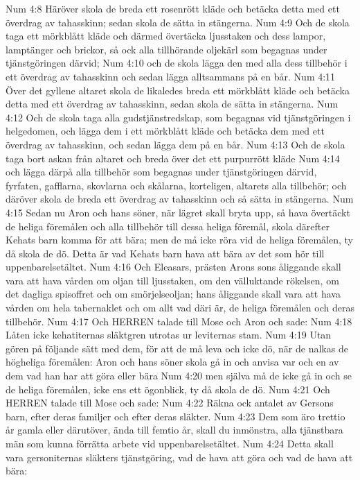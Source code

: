 Num 4:8  Häröver skola de breda ett rosenrött kläde och betäcka detta med ett överdrag av tahasskinn; sedan skola de sätta in stängerna.
Num 4:9  Och de skola taga ett mörkblått kläde och därmed övertäcka ljusstaken och dess lampor, lamptänger och brickor, så ock alla tillhörande oljekärl som begagnas under tjänstgöringen därvid;
Num 4:10  och de skola lägga den med alla dess tillbehör i ett överdrag av tahasskinn och sedan lägga alltsammans på en bår.
Num 4:11  Över det gyllene altaret skola de likaledes breda ett mörkblått kläde och betäcka detta med ett överdrag av tahasskinn, sedan skola de sätta in stängerna.
Num 4:12  Och de skola taga alla gudstjänstredskap, som begagnas vid tjänstgöringen i helgedomen, och lägga dem i ett mörkblått kläde och betäcka dem med ett överdrag av tahasskinn, och sedan lägga dem på en bår.
Num 4:13  Och de skola taga bort askan från altaret och breda över det ett purpurrött kläde
Num 4:14  och lägga därpå alla tillbehör som begagnas under tjänstgöringen därvid, fyrfaten, gafflarna, skovlarna och skålarna, korteligen, altarets alla tillbehör; och däröver skola de breda ett överdrag av tahasskinn och så sätta in stängerna.
Num 4:15  Sedan nu Aron och hans söner, när lägret skall bryta upp, så hava övertäckt de heliga föremålen och alla tillbehör till dessa heliga föremål, skola därefter Kehats barn komma för att bära; men de må icke röra vid de heliga föremålen, ty då skola de dö. Detta är vad Kehats barn hava att bära av det som hör till uppenbarelsetältet.
Num 4:16  Och Eleasars, prästen Arons sons åliggande skall vara att hava vården om oljan till ljusstaken, om den välluktande rökelsen, om det dagliga spisoffret och om smörjelseoljan; hans åliggande skall vara att hava vården om hela tabernaklet och om allt vad däri är, de heliga föremålen och deras tillbehör.
Num 4:17  Och HERREN talade till Mose och Aron och sade:
Num 4:18  Låten icke kehatiternas släktgren utrotas ur leviternas stam.
Num 4:19  Utan gören på följande sätt med dem, för att de må leva och icke dö, när de nalkas de högheliga föremålen: Aron och hans söner skola gå in och anvisa var och en av dem vad han har att göra eller bära
Num 4:20  men själva må de icke gå in och se de heliga föremålen, icke ens ett ögonblick, ty då skola de dö.
Num 4:21  Och HERREN talade till Mose och sade:
Num 4:22  Räkna ock antalet av Gersons barn, efter deras familjer och efter deras släkter.
Num 4:23  Dem som äro trettio år gamla eller därutöver, ända till femtio år, skall du inmönstra, alla tjänstbara män som kunna förrätta arbete vid uppenbarelsetältet.
Num 4:24  Detta skall vara gersoniternas släkters tjänstgöring, vad de hava att göra och vad de hava att bära:
